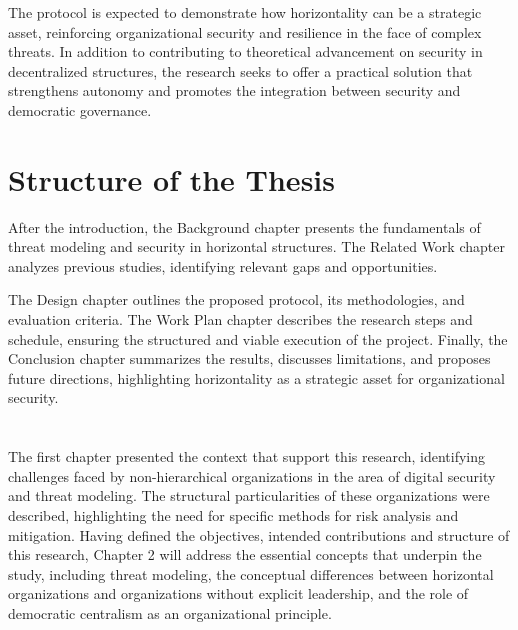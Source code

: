 The protocol is expected to demonstrate how horizontality can be a strategic
asset, reinforcing organizational security and resilience in the face of complex
threats. In addition to contributing to theoretical advancement on security in
decentralized structures, the research seeks to offer a practical solution that
strengthens autonomy and promotes the integration between security and
democratic governance.

\section{Structure of the Thesis}
\label{sec:structure_thesis}

After the introduction, the Background chapter presents the fundamentals of
threat modeling and security in horizontal structures. The Related Work chapter
analyzes previous studies, identifying relevant gaps and opportunities.

The Design chapter outlines the proposed protocol, its methodologies, and
evaluation criteria. The Work Plan chapter describes the research steps and
schedule, ensuring the structured and viable execution of the project. Finally,
the Conclusion chapter summarizes the results, discusses limitations, and
proposes future directions, highlighting horizontality as a strategic asset for
organizational security.

\section*{} 
The first chapter presented the context that support this research, identifying
challenges faced by non-hierarchical organizations in the area of digital
security and threat modeling. The structural particularities of these
organizations were described, highlighting the need for specific methods for
risk analysis and mitigation. Having defined the objectives, intended
contributions and structure of this research, Chapter 2 will address the
essential concepts that underpin the study, including threat modeling, the
conceptual differences between horizontal organizations and organizations
without explicit leadership, and the role of democratic centralism as an
organizational principle.
